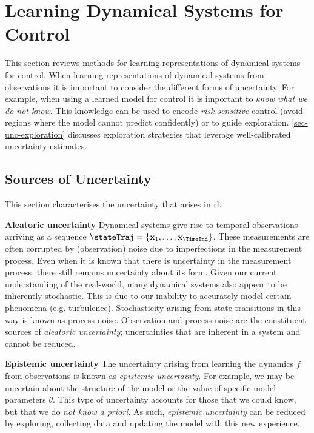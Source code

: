 \documentclass{mimosis-class/mimosis}
\numberwithin{equation}{chapter}
\newcommand{\state}{\ensuremath{\mathbf{x}}}
\begin{document}
\section{Learning Dynamical Systems for Control}
\label{sec:org1955f2c}
This section reviews methods for learning representations of dynamical systems for control.
When learning representations of dynamical systems from observations it is important to consider the different
forms of uncertainty.
For example, when using a learned model for control it is important to \emph{know what we do not know}.
This knowledge can be used to encode \emph{risk-sensitive} control (avoid regions where the model cannot predict confidently)
or to guide exploration.
\cref{sec-unc-exploration} discusses exploration strategies that leverage well-calibrated uncertainty estimates.

\subsection{Sources of Uncertainty}
\label{sec:org6633afd}
This section characterises the uncertainty that arises in \acrshort{rl}.

\textbf{Aleatoric uncertainty}
Dynamical systems give rise to temporal observations arriving as a sequence
\(\stateTraj = \{\state_1, \ldots, \state_\TimeInd\}\).
These measurements are often corrupted by (observation) noise due to imperfections in the measurement process.
Even when it is known that there is uncertainty in the measurement process, there still remains uncertainty about its
form.
Given our current understanding of the real-world, many dynamical systems also appear to be inherently stochastic.
This is due to our inability to accurately model certain phenomena (e.g. turbulence).
Stochasticity arising from state transitions in this way is known as process noise.
Observation and process noise are the constituent sources of \emph{aleatoric uncertainty};
uncertainties that are inherent in a system and cannot be reduced.

\textbf{Epistemic uncertainty}
The uncertainty arising from learning the dynamics \(f\) from observations is known as \emph{epistemic uncertainty}.
For example, we may be uncertain about the structure of the model or the value of specific
model parameters \(\theta\).
This type of uncertainty accounts for those that we could know, but that we do \emph{not know a priori}.
As such, \emph{epistemic uncertainty} can be reduced by exploring, collecting data and updating the model with
this new experience.
\end{document}
